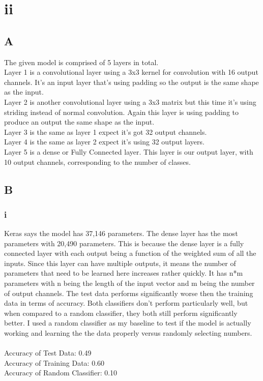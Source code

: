 \documentclass[11pt]{article} %
\begin{document}
\clearpage
\section{ii}
\subsection{A}
The given model is comprised of 5 layers in total. \\ Layer 1 is a convolutional layer using a 3x3 kernel for convolution with 16 output channels.  It's an input layer that's using padding so the output is the same shape as the input.  \\ Layer 2 is another convolutional layer using a 3x3 matrix but this time it's using striding instead of normal convolution. Again this layer is using padding to produce an output the same shape as the input. \\ Layer 3 is the same as layer 1 expect it's got 32 output channels. \\ Layer 4 is the same as layer 2 expect it's using 32 output layers. \\ Layer 5 is a dense or Fully Connected layer. This layer is our output layer, with 10 output channels, corresponding to the number of classes.
\subsection{B}
\subsubsection{i}
Keras says the model has 37,146 parameters.  The dense layer has the most parameters with 20,490 parameters.  This is because the dense layer is a fully connected layer with each output being a function of the weighted sum of all the inputs. Since this layer can have multiple outputs, it means the number of parameters that need to be learned here increases rather quickly.  It has n*m parameters with n being the length of the input vector and m being the number of output channels. The test data performs significantly worse then the training data in terms of accuracy.  Both classifiers don't perform particularly well,  but when compared to a random classifier, they both still perform significantly better.  I used a random classifier as my baseline to test if the model is actually working and learning the the data properly versus randomly selecting numbers.
\\\\ Accuracy of Test Data: 0.49
\\ Accuracy of Training Data: 0.60
\\ Accuracy of Random Classifier: 0.10
\end{document}
